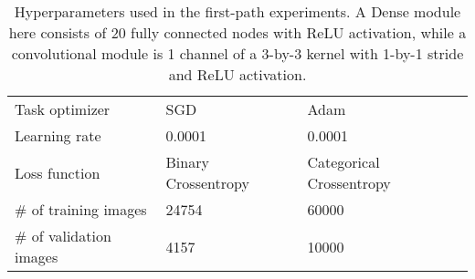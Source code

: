 \begin{table}[ht]
\begin{tabular}{lll}
Task optimizer         & SGD                                                                                          & Adam                                                                                                                                                              \\
Learning rate          & 0.0001                                                                                       & 0.0001                                                                                                                                                            \\
Loss function          & Binary Crossentropy                                                                          & Categorical Crossentropy                                                                                                                                          \\
\# of training images   & 24754                                                                                        & 60000                                                                                                                                          \\
\# of validation images & 4157                                                                                         & 10000    

\end{tabular}
\caption[Hyperparameters for Selection vs Search experiment]{Hyperparameters used in the first-path experiments. A Dense module here consists of 20 fully connected nodes with ReLU activation, while a convolutional module is 1 channel of a 3-by-3 kernel with 1-by-1 stride and ReLU activation.}
\label{tab:exp1.hyperparam}
\end{table}